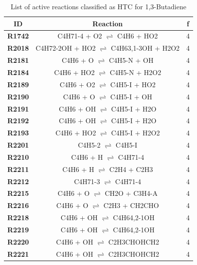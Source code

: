 \begin{table}[!ht]
\centering
\caption{List of active reactions classified as HTC for 1,3-Butadiene}
\label{table:1,3-Butadiene_HTC}
\begin{tabular}{ccc}
\hline
\textbf{ID} & \textbf{Reaction} & \textbf{f} \\
\hline
\textbf{R1742} & C4H71-4 + O2 $\rightleftharpoons$ C4H6 + HO2 & 4 \\
\textbf{R2018} & C4H72-2OH + HO2 $\rightleftharpoons$ C4H63,1-3OH + H2O2 & 4 \\
\textbf{R2181} & C4H6 + O $\rightleftharpoons$ C4H5-N + OH & 4 \\
\textbf{R2184} & C4H6 + HO2 $\rightleftharpoons$ C4H5-N + H2O2 & 4 \\
\textbf{R2189} & C4H6 + O2 $\rightleftharpoons$ C4H5-I + HO2 & 4 \\
\textbf{R2190} & C4H6 + O $\rightleftharpoons$ C4H5-I + OH & 4 \\
\textbf{R2191} & C4H6 + OH $\rightleftharpoons$ C4H5-I + H2O & 4 \\
\textbf{R2192} & C4H6 + OH $\rightleftharpoons$ C4H5-I + H2O & 4 \\
\textbf{R2193} & C4H6 + HO2 $\rightleftharpoons$ C4H5-I + H2O2 & 4 \\
\textbf{R2201} & C4H5-2 $\rightleftharpoons$ C4H5-I & 4 \\
\textbf{R2210} & C4H6 + H $\rightleftharpoons$ C4H71-4 & 4 \\
\textbf{R2211} & C4H6 + H $\rightleftharpoons$ C2H4 + C2H3 & 4 \\
\textbf{R2212} & C4H71-3 $\rightleftharpoons$ C4H71-4 & 4 \\
\textbf{R2215} & C4H6 + O $\rightleftharpoons$ CH2O + C3H4-A & 4 \\
\textbf{R2216} & C4H6 + O $\rightleftharpoons$ C2H3 + CH2CHO & 4 \\
\textbf{R2218} & C4H6 + OH $\rightleftharpoons$ C4H64,2-1OH & 4 \\
\textbf{R2219} & C4H6 + OH $\rightleftharpoons$ C4H64,2-1OH & 4 \\
\textbf{R2220} & C4H6 + OH $\rightleftharpoons$ C2H3CHOHCH2 & 4 \\
\textbf{R2221} & C4H6 + OH $\rightleftharpoons$ C2H3CHOHCH2 & 4 \\
\hline
\end{tabular}
\end{table}